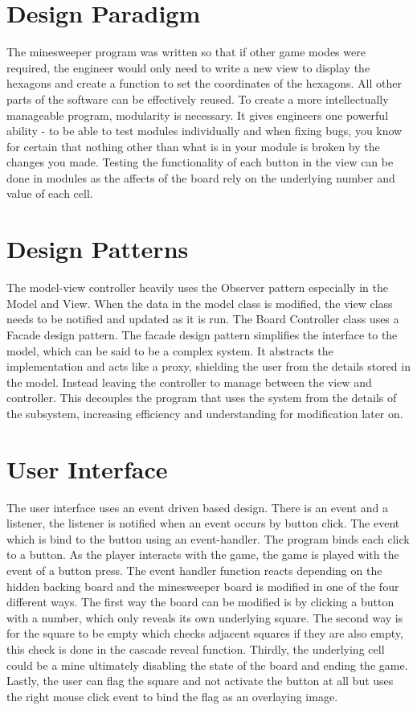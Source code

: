\documentclass[12pt, a4]{report}
\begin{document}
	\section{Design Paradigm}
	The minesweeper program was written so that if other game modes were required, the engineer would only need to write a new view to display the hexagons and create a function
	to set the coordinates of the hexagons. All other parts of the software can be effectively reused. To create a more intellectually manageable program, modularity is necessary.
	It gives engineers one powerful ability - to be able to test modules individually and when fixing bugs, you know for certain that nothing other than what is in your module is
	broken by the changes you made. Testing the functionality of each button in the view can be done in modules as the affects of the board rely on the underlying number and value of each cell. 
	
	\section{Design Patterns}
	\par The model-view controller heavily uses the Observer pattern especially in the Model and View. When the data in the model class is modified, the view class needs to be notified and updated as it is run. 
	The Board Controller class uses a Facade design pattern. The facade design pattern simplifies the interface to the model, which can be said to be a complex system. It abstracts the implementation and acts like a proxy, shielding the user from the details stored in the model. Instead leaving the controller to manage between the view and controller. This decouples the program that uses the system from the details of the subsystem, increasing efficiency and understanding for modification later on. 

	\section{User Interface}
	The user interface uses an event driven based design. There is an event and a listener, the listener is notified when an event occurs by button click. The event which is bind to the button using an event-handler. The program binds each click to a button. As the player interacts with the game, the game is played with the event of a button press. The event handler function reacts depending on the hidden backing board and the minesweeper board is modified in one of the four different ways. The first way the board can be modified is by clicking a button with a number, which only reveals its own underlying square. The second way is for the square to be empty which checks adjacent squares if they are also empty, this check is done in the cascade reveal function. Thirdly, the underlying cell could be a mine ultimately disabling the state of the board and ending the game. Lastly, the user can flag the square and not activate the button at all but uses the right mouse click event to bind the flag as an overlaying image. 
	
\end{document}
